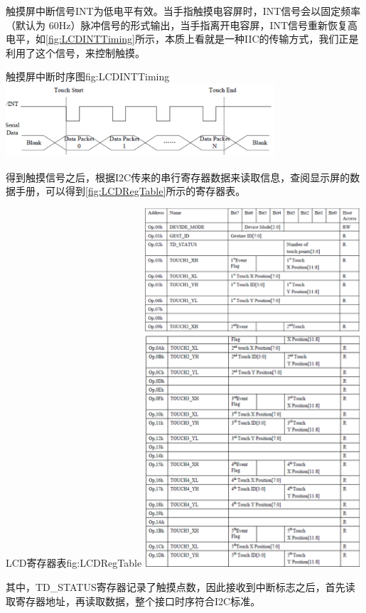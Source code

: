 \documentclass[supercite]{HustGraduPaper}
\begin{document}
	触摸屏中断信号INT为低电平有效。当手指触摸电容屏时，INT信号会以固定频率（默认为 60Hz）脉冲信号的形式输出，当手指离开电容屏，INT信号重新恢复高电平，如\autoref{fig:LCDINTTiming}所示，本质上看就是一种IIC的传输方式，我们正是利用了这个信号，来控制触摸。
	
	\begin{generalfig}[htb]{触摸屏中断时序图}{fig:LCDINTTiming}
		\includegraphics[width=10cm]{Figures/LCDINTTiming.png}
	\end{generalfig}
	
	得到触摸信号之后，根据I2C传来的串行寄存器数据来读取信息，查阅显示屏的数据手册，可以得到\autoref{fig:LCDRegTable}所示的寄存器表。
	
	\begin{generalfig}[htb]{LCD寄存器表}{fig:LCDRegTable}
		\includegraphics[width=8cm]{Figures/LCDRegTable.png}
	\end{generalfig}
	
	其中，TD\_STATUS寄存器记录了触摸点数，因此接收到中断标志之后，首先读取寄存器地址，再读取数据，整个接口时序符合I2C标准。
	
\end{document}
